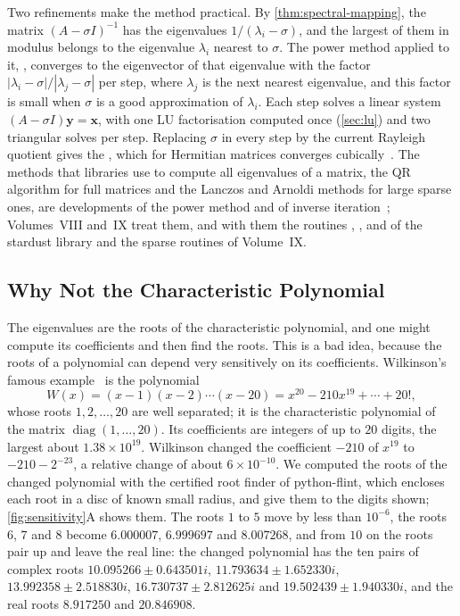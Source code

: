 Two refinements make the method practical. By \cref{thm:spectral-mapping}, the matrix $(A-\sigma I)^{-1}$ has the eigenvalues $1/(\lambda_i-\sigma)$, and the largest of them in modulus belongs to the eigenvalue $\lambda_i$ nearest to $\sigma$. The power method applied to it, , converges to the eigenvector of that eigenvalue with the factor $|\lambda_i-\sigma|/|\lambda_j-\sigma|$ per step, where $\lambda_j$ is the next nearest eigenvalue, and this factor is small when $\sigma$ is a good approximation of $\lambda_i$. Each step solves a linear system $(A-\sigma I)\mathbf y=\mathbf x$, with one LU factorisation computed once (\cref{sec:lu}) and two triangular solves per step. Replacing $\sigma$ in every step by the current Rayleigh quotient gives the , which for Hermitian matrices converges cubically~\cite{parlett1998}. The methods that libraries use to compute all eigenvalues of a matrix, the QR algorithm for full matrices and the Lanczos and Arnoldi methods for large sparse ones, are developments of the power method and of inverse iteration~\cite{golub2013,trefethen1997}; Volumes~VIII and~IX treat them, and with them the routines , ,  and  of the stardust library and the sparse routines of Volume~IX.

\subsection{Why Not the Characteristic Polynomial}

The eigenvalues are the roots of the characteristic polynomial, and one might compute its coefficients and then find the roots. This is a bad idea, because the roots of a polynomial can depend very sensitively on its coefficients. Wilkinson's famous example~\cite{wilkinson1959,wilkinson1965} is the polynomial
\[
W(x)=(x-1)(x-2)\cdots(x-20)=x^{20}-210x^{19}+\cdots+20!,
\]
whose roots $1,2,\ldots,20$ are well separated; it is the characteristic polynomial of the matrix $\operatorname{diag}(1,\ldots,20)$. Its coefficients are integers of up to $20$ digits, the largest about $1.38\times10^{19}$. Wilkinson changed the coefficient $-210$ of $x^{19}$ to $-210-2^{-23}$, a relative change of about $6\times10^{-10}$. We computed the roots of the changed polynomial with the certified root finder of python-flint, which encloses each root in a disc of known small radius, and give them to the digits shown; \cref{fig:sensitivity}A shows them. The roots $1$ to $5$ move by less than $10^{-6}$, the roots $6$, $7$ and $8$ become $6.000007$, $6.999697$ and $8.007268$, and from $10$ on the roots pair up and leave the real line: the changed polynomial has the ten pairs of complex roots $10.095266\pm0.643501i$, $11.793634\pm1.652330i$, $13.992358\pm2.518830i$, $16.730737\pm2.812625i$ and $19.502439\pm1.940330i$, and the real roots $8.917250$ and $20.846908$.

